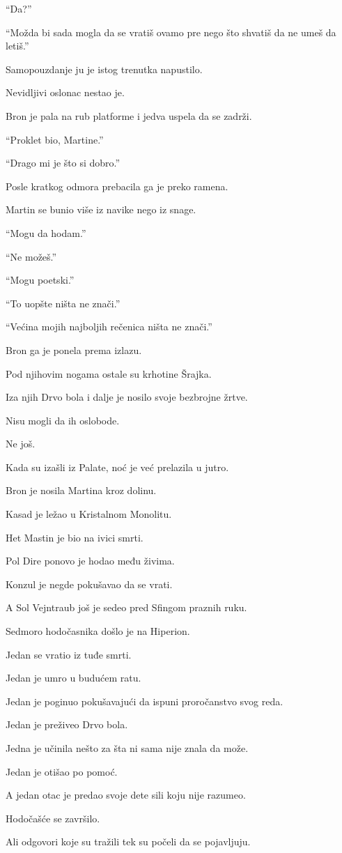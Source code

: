 ``Da?''

``Možda bi sada mogla da se vratiš ovamo pre nego što shvatiš da ne umeš da letiš.''

Samopouzdanje ju je istog trenutka napustilo.

Nevidljivi oslonac nestao je.

Bron je pala na rub platforme i jedva uspela da se zadrži.

``Proklet bio, Martine.''

``Drago mi je što si dobro.''

\bigskip

Posle kratkog odmora prebacila ga je preko ramena.

Martin se bunio više iz navike nego iz snage.

``Mogu da hodam.''

``Ne možeš.''

``Mogu poetski.''

``To uopšte ništa ne znači.''

``Većina mojih najboljih rečenica ništa ne znači.''

Bron ga je ponela prema izlazu.

Pod njihovim nogama ostale su krhotine Šrajka.

Iza njih Drvo bola i dalje je nosilo svoje bezbrojne žrtve.

Nisu mogli da ih oslobode.

Ne još.

\bigskip

Kada su izašli iz Palate, noć je već prelazila u jutro.

Bron je nosila Martina kroz dolinu.

Kasad je ležao u Kristalnom Monolitu.

Het Mastin je bio na ivici smrti.

Pol Dire ponovo je hodao među živima.

Konzul je negde pokušavao da se vrati.

A Sol Vejntraub još je sedeo pred Sfingom praznih ruku.

\bigskip

Sedmoro hodočasnika došlo je na Hiperion.

Jedan se vratio iz tuđe smrti.

Jedan je umro u budućem ratu.

Jedan je poginuo pokušavajući da ispuni proročanstvo svog reda.

Jedan je preživeo Drvo bola.

Jedna je učinila nešto za šta ni sama nije znala da može.

Jedan je otišao po pomoć.

A jedan otac je predao svoje dete sili koju nije razumeo.

\bigskip

Hodočašće se završilo.

Ali odgovori koje su tražili tek su počeli da se pojavljuju.